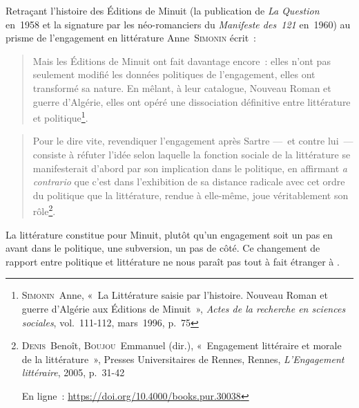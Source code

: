 \documentclass[12pt, a4paper]{article}
\begin{document}
 Retraçant l'histoire des Éditions de Minuit (la publication de \textit{La Question} en~1958 et la signature par les néo-romanciers du \textit{Manifeste des~121} en~1960) au prisme de l'engagement en littérature Anne~\textsc{Simonin} écrit~:
\begin{quote}
    Mais les Éditions de Minuit ont fait davantage encore~: elles n'ont pas seulement modifié les données politiques de l'engagement, elles ont transformé sa nature. En mêlant, à leur catalogue, Nouveau Roman et guerre d'Algérie, elles ont opéré une dissociation définitive entre littérature et politique\footnote{\textsc{Simonin}~Anne, «~La Littérature saisie par l'histoire. Nouveau Roman et guerre d'Algérie aux Éditions de Minuit~»,  \textit{Actes de la recherche en sciences sociales}, vol.~111-112, mars~1996, p.~75}. 
\end{quote}

\begin{quote}
    Pour le dire vite, revendiquer l’engagement après Sartre —~et contre lui~— consiste à réfuter l’idée selon laquelle la fonction sociale de la littérature se manifesterait d’abord par son implication dans le politique, en affirmant \textit{a contrario} que c’est dans l’exhibition de sa distance radicale avec cet ordre du politique que la littérature, rendue à elle-même, joue véritablement son rôle\footnote{\textsc{Denis}~Benoît, \textsc{Boujou}~Emmanuel (dir.), «~Engagement littéraire et morale de la littérature~», Presses Universitaires de Rennes, Rennes, \textit{L'Engagement littéraire}, 2005, p.~31-42
            
            En ligne~: \hyperlink{https://doi.org/10.4000/books.pur.30038}{https://doi.org/10.4000/books.pur.30038}}.
\end{quote}

La littérature constitue pour Minuit, plutôt qu'un engagement soit un pas en avant dans le politique, une subversion, un pas de côté. Ce changement de rapport entre politique et littérature ne nous paraît pas tout à fait étranger à \punr.
\end{document}
